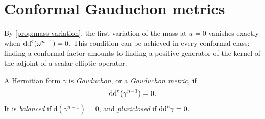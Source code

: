 \section{Conformal Gauduchon metrics}

By \cref{prop:mass-variation}, the first variation of the mass at $u=0$ vanishes exactly when $\mathrm{dd}^{\mathrm{c}}(\omega^{n-1})=0$. This condition can be achieved in every conformal class: finding a conformal factor amounts to finding a positive generator of the kernel of the adjoint of a scalar elliptic operator.

\begin{definition}\label{def:gauduchon-metric}\label{def:balanced-pluriclosed}
A Hermitian form $\gamma$ is \emph{Gauduchon}, or a \emph{Gauduchon metric}, if
\[
 \mathrm{dd}^{\mathrm{c}}(\gamma^{n-1})=0.
\]
It is \emph{balanced} if $\mathrm d(\gamma^{n-1})=0$, and \emph{pluriclosed} if $\mathrm{dd}^{\mathrm{c}}\gamma=0$.
\end{definition}

